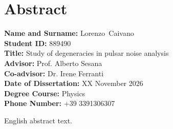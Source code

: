 \documentclass[12pt]{report}
\newcommand{\surnameEN}{Caivano}
\newcommand{\nameEN}{Lorenzo}
\newcommand{\matricolaEN}{889490}
\newcommand{\thesisTitleEN}{Study of degeneracies in pulsar noise analysis}
\newcommand{\advisorEN}{Prof. Alberto Sesana}
\newcommand{\coadvisorEN}{Dr. Irene Ferranti}
\newcommand{\defenseDateEN}{XX November 2026}
\newcommand{\degreeCourseEN}{Physics}
\newcommand{\phoneEN}{+39 3391306307}
\begin{document}
\newpage
\chapter*{Abstract}
\begin{center}
\textbf{Name and Surname:} \nameEN \, \surnameEN \\[0.3cm]
\textbf{Student ID:} \matricolaEN \\[0.3cm]
\textbf{Title:} \thesisTitleEN \\[0.3cm]
\textbf{Advisor:} \advisorEN \\[0.3cm]
\textbf{Co-advisor:} \coadvisorEN \\[0.3cm]
\textbf{Date of Dissertation:} \defenseDateEN \\[0.3cm]
\textbf{Degree Course:} \degreeCourseEN \\[0.3cm]
\textbf{Phone Number:} \phoneEN \\
\vspace{1cm}
\end{center}
\sloppy

\noindent
English abstract text. \par
\end{document}
